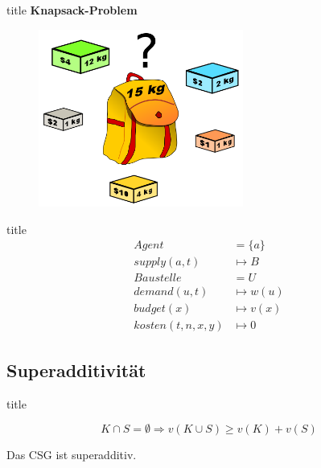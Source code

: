 \documentclass[c]{beamer}
\theoremstyle{break}
\begin{document}
  \begin{frame}{title} %
    \textbf{Knapsack-Problem}
    \begin{figure}
      \centering
      \includegraphics[width=0.6\textwidth]{Knapsack.png}
    \end{figure}
  \end{frame}

  \begin{frame}{title}
    \begin{align}
      Agent &= \{a\} \\
      supply(a, t) &\mapsto B \\
      Baustelle &= U \\
      demand(u, t) &\mapsto w(u) \\
      budget(x) &\mapsto v(x) \\
      kosten(t, n, x, y) &\mapsto 0
    \end{align}
  \end{frame}

  \subsection*{Superadditivität}
  \begin{frame}{title} %
    \begin{definition}[Superadditivität]
      \[ K\cap S =\emptyset \Rightarrow v(K\cup S) \geq v(K) + v(S) \]
    \end{definition}
    \begin{lemma}
      Das CSG ist superadditiv. \\
    \end{lemma}
  \end{frame}
\end{document}
